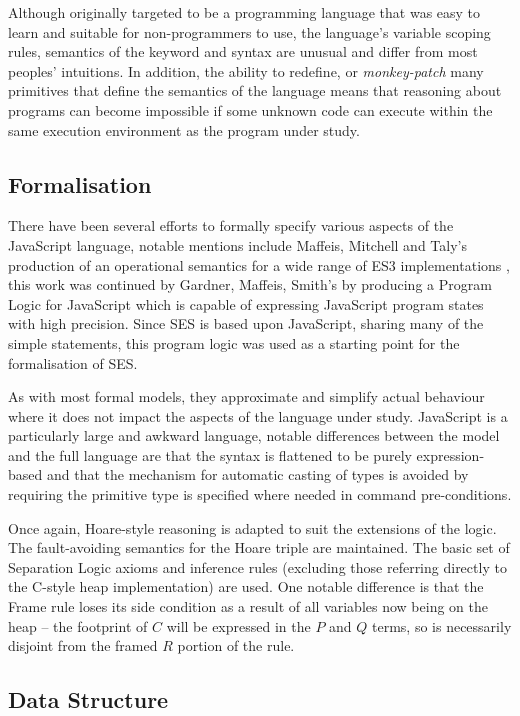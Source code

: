 \documentclass[a4paper,notitlepage]{report}
\begin{document}
  Although originally targeted to be a programming language that was easy to
  learn and suitable for non-programmers to use, the language's variable scoping
  rules, semantics of the  keyword and  syntax are unusual
  and differ from most peoples' intuitions. In addition, the ability to
  redefine, or \emph{monkey-patch} many primitives that define the semantics of
  the language means that reasoning about programs can become impossible if
  some unknown code can execute within the same execution environment as the
  program under study.

  \subsection{Formalisation}
  There have been several efforts to formally specify various aspects of the
  JavaScript language, notable mentions include Maffeis, Mitchell and Taly's
  production of an operational semantics for a wide range of ES3
  implementations \cite{maffeis-jsopsem}, this work was continued by
  Gardner, Maffeis, Smith's \cite{gms-popl} by producing a
  Program Logic for JavaScript which is capable of expressing JavaScript
  program states with high precision. Since SES is based upon JavaScript,
  sharing many of the simple statements, this program logic was used as a
  starting point for the formalisation of SES.

  As with most formal models, they approximate and simplify actual behaviour
  where it does not impact the aspects of the language under study. JavaScript
  is a particularly large and awkward language, notable differences between the
  model and the full language are that the syntax is flattened to be purely
  expression-based and that the mechanism for automatic casting of types is
  avoided by requiring the primitive type is specified where needed in command
  pre-conditions.

  Once again, Hoare-style reasoning is adapted to suit the extensions of the
  logic. The fault-avoiding semantics for the Hoare triple are maintained. The
  basic set of Separation Logic axioms and inference rules (excluding those
  referring directly to the C-style heap implementation) are used. One notable
  difference is that the Frame rule loses its side condition as a result of all
  variables now being on the heap -- the footprint of $C$ will be expressed in
  the $P$ and $Q$ terms, so is necessarily disjoint from the framed $R$ portion of
  the rule.

  \subsection{Data Structure}
  \label{sec:intro:js:datastructure}
\end{document}
